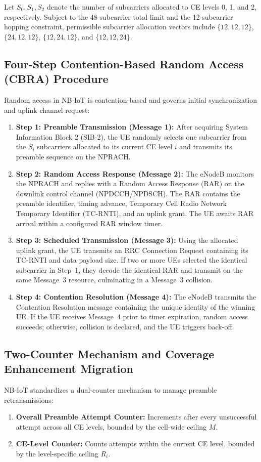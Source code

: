Let $S_0, S_1, S_2$ denote the number of subcarriers allocated to CE levels 0, 1, and 2, respectively. Subject to the 48-subcarrier total limit and the 12-subcarrier hopping constraint, permissible subcarrier allocation vectors include $\{12, 12, 12\}$, $\{24, 12, 12\}$, $\{12, 24, 12\}$, and $\{12, 12, 24\}$.

\subsection{Four-Step Contention-Based Random Access (CBRA) Procedure}
Random access in NB-IoT is contention-based and governs initial synchronization and uplink channel request:
\begin{enumerate}
    \item \textbf{Step 1: Preamble Transmission (Message 1):} After acquiring System Information Block 2 (SIB-2), the UE randomly selects one subcarrier from the $S_i$ subcarriers allocated to its current CE level $i$ and transmits its preamble sequence on the NPRACH.
    \item \textbf{Step 2: Random Access Response (Message 2):} The eNodeB monitors the NPRACH and replies with a Random Access Response (RAR) on the downlink control channel (NPDCCH/NPDSCH). The RAR contains the preamble identifier, timing advance, Temporary Cell Radio Network Temporary Identifier (TC-RNTI), and an uplink grant. The UE awaits RAR arrival within a configured RAR window timer.
    \item \textbf{Step 3: Scheduled Transmission (Message 3):} Using the allocated uplink grant, the UE transmits an RRC Connection Request containing its TC-RNTI and data payload size. If two or more UEs selected the identical subcarrier in Step~1, they decode the identical RAR and transmit on the same Message~3 resource, culminating in a Message~3 collision.
    \item \textbf{Step 4: Contention Resolution (Message 4):} The eNodeB transmits the Contention Resolution message containing the unique identity of the winning UE. If the UE receives Message~4 prior to timer expiration, random access succeeds; otherwise, collision is declared, and the UE triggers back-off.
\end{enumerate}

\subsection{Two-Counter Mechanism and Coverage Enhancement Migration}
NB-IoT standardizes a dual-counter mechanism to manage preamble retransmissions:
\begin{enumerate}
    \item \textbf{Overall Preamble Attempt Counter:} Increments after every unsuccessful attempt across all CE levels, bounded by the cell-wide ceiling $M$.
    \item \textbf{CE-Level Counter:} Counts attempts within the current CE level, bounded by the level-specific ceiling $R_i$.
\end{enumerate}

